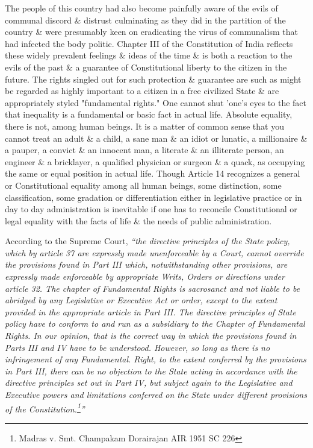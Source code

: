 \begin{multicols}{2}
\noi
The people of this country had also become painfully aware of the evils of communal discord \& distrust culminating as they did in the partition of the country \& were presumably keen on eradicating the virus of communalism that had infected the body politic. Chapter III of the Constitution of India reflects these widely prevalent feelings \& ideas of the time \& is both a reaction to the evils of the past \& a guarantee of Constitutional liberty to the citizen in the future. The rights singled out for such protection \& guarantee are such as might be regarded as highly important to a citizen in a free civilized State \& are appropriately styled "fundamental rights." One cannot shut 'one's eyes to the fact that inequality is a fundamental or basic fact in actual life. Absolute equality, there is not, among human beings. It is a matter of common sense that you cannot treat an adult \& a child, a sane man \& an idiot or lunatic, a millionaire \& a pauper, a convict \& an innocent man, a literate \& an illiterate person, an engineer \& a bricklayer, a qualified physician or surgeon \& a quack, as occupying the same or equal position in actual life. Though Article 14 recognizes a general or Constitutional equality among all human beings, some distinction, some classification, some gradation or differentiation either in legislative practice or in day to day administration is inevitable if one has to reconcile Constitutional or legal equality with the facts of life \& the needs of public administration.

\noi
According to the Supreme Court, \textit{“the directive principles of the State policy, which by article 37 are expressly made unenforceable by a Court, cannot override the provisions found in Part III which, notwithstanding other provisions, are expressly made enforceable by appropriate Writs, Orders or directions under article 32. The chapter of Fundamental Rights is sacrosanct and not liable to be abridged by any Legislative or Executive Act or order, except to the extent provided in the appropriate article in Part III. The directive principles of State policy have to conform to and run as a subsidiary to the Chapter of Fundamental Rights. In our opinion, that is the correct way in which the provisions found in Parts III and IV have to be understood. However, so long as there is no infringement of any Fundamental. Right, to the extent conferred by the provisions in Part III, there can be no objection to the State acting in accordance with the directive principles set out in Part IV, but subject again to the Legislative and Executive powers and limitations conferred on the State under different provisions of the Constitution.\footnote{Madras v. Smt. Champakam Dorairajan AIR 1951 SC 226}”}


\end{multicols}
